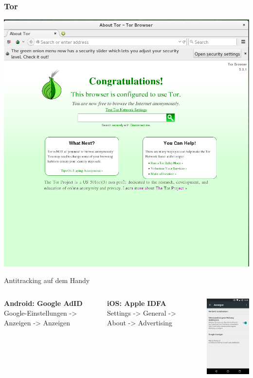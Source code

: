 \documentclass[12pt, xcolor={svgnames,table}]{beamer}
\begin{document}
\begin{frame}
  \frametitle{Tor}
  \begin{center}
    \includegraphics[height=0.8\textheight]{img/torbrowser1.png}
  \end{center}
\end{frame}

\begin{frame}{Antitracking auf dem Handy}
  \begin{columns}
    \column{5.5cm}
    \footnotesize

    \textbf{Android: Google AdID}\\
    Google-Einstellungen -> Anzeigen -> Anzeigen\\
    \vspace{0.5cm}

    \textbf{iOS: Apple IDFA}\\
    Settings -> General -> About -> Advertising\\
    \vspace{0.5cm}

    \column{5cm}

    \begin{center}
      \includegraphics[width=3.5cm]{img/google-adid.png}
    \par\end{center}
  \end{columns}
\end{frame}
\end{document}
